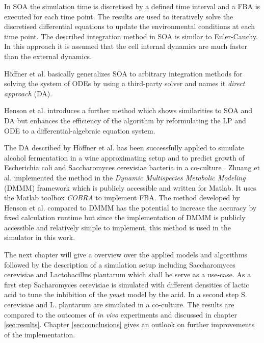In SOA the simulation time is discretised by a defined time interval and a FBA is executed for
each time point. The results are used to iteratively solve the discretised differential equations
to update the environmental conditions at each time point. The described integration method in SOA
is similar to Euler-Cauchy.
In this approach it is assumed that the cell internal dynamics are much faster than the external dynamics.

Höffner et al. basically generalizes SOA to arbitrary integration methods for solving the system of ODEs
by using a third-party solver and names it \textit{direct approach} (DA)\cite{hoffner_reliable_2013}.

Henson et al. introduces a further method which shows similarities to SOA and DA but enhances the efficiency of the
algorithm\cite{hoffner_reliable_2013} by reformulating the LP and ODE to a 
differential-algebraic equation system\cite{henson_dynamic_2014}.

The DA described by Höffner et al. has been successfully applied to simulate alcohol fermentation
in a wine approximating setup \cite{sainz_modeling_2003} \cite{pizarro_coupling_2007} and to
predict growth of Escherichia coli and Saccharomyces cerevisiae bacteria in a co-culture
\cite{hanly_dynamic_2011}. Zhuang et al. implemented
the method in the \textit{Dynamic Multispecies Metabolic Modeling} (DMMM) framework
which is publicly accessible and written for Matlab\cite{zhuang_design_2012}. It uses the Matlab
toolbox \textit{COBRA}\cite{heirendt_creation_nodate} to implement FBA.
The method developed by Henson et al. compared to DMMM has the potential to increase the accuracy
by fixed calculation runtime but since the implementation of DMMM is publicly accessible and
relatively simple to implement, this method is used in the simulator in this work.

The next chapter will give a overview over the applied models and algorithms followed by the
description of a simulation setup including Saccharomyces cerevisiae and Lactobacillus plantarum
which shall be serve as a use-case. As a first step Sacharomyces cerevisiae is simulated with
different densities of lactic acid to tune the inhibition of the yeast model by the acid. In a
second step S. cerevisiae and L. plantarum are simulated in a co-culture.
The results are compared to the outcomes of \textit{in vivo} experiments and discussed in chapter \ref{sec:results}.
Chapter \ref{sec:conclusions} gives an outlook on further improvements of the implementation.

